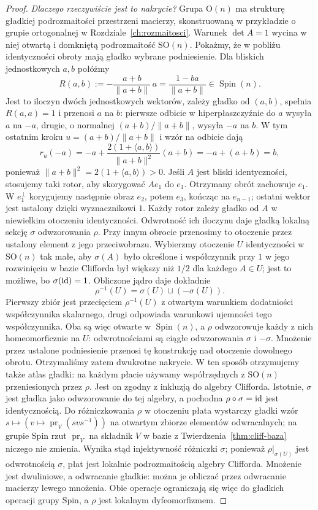\begin{proof}
\emph{Dlaczego rzeczywiście jest to nakrycie?}
Grupa $\mathrm O(n)$ ma strukturę gładkiej podrozmaitości
przestrzeni macierzy, skonstruowaną w przykładzie o grupie
ortogonalnej w Rozdziale~\ref{ch:rozmaitosci}.
Warunek $\det A=1$ wycina w niej otwartą i domkniętą
podrozmaitość $\mathrm{SO}(n)$.
Pokażmy, że w pobliżu identyczności obroty mają
gładko wybrane podniesienie. Dla bliskich
jednostkowych $a,b$ połóżmy
\[
 R(a,b):=-\frac{a+b}{\|a+b\|}\,a
       =\frac{1-ba}{\|a+b\|}\in\operatorname{Spin}(n).
\]
Jest to iloczyn dwóch jednostkowych wektorów,
zależy gładko od $(a,b)$, spełnia $R(a,a)=1$
i przenosi $a$ na $b$: pierwsze odbicie w
hiperpłaszczyźnie do $a$ wysyła $a$ na $-a$,
drugie, o normalnej $(a+b)/\|a+b\|$, wysyła
$-a$ na $b$.
W tym ostatnim kroku $u=(a+b)/\|a+b\|$ i wzór na odbicie dają
\[
 r_u(-a)
 =-a+\frac{2(1+\langle a,b\rangle)}{\|a+b\|^2}(a+b)
 =-a+(a+b)=b,
\]
ponieważ $\|a+b\|^2=2(1+\langle a,b\rangle)>0$.
Jeśli $A$ jest bliski identyczności,
stosujemy taki rotor, aby skorygować $Ae_1$ do
$e_1$. Otrzymany obrót zachowuje $e_1$.
W $e_1^\perp$ korygujemy następnie obraz
$e_2$, potem $e_3$, kończąc na $e_{n-1}$;
ostatni wektor jest ustalony dzięki wyznacznikowi
$1$. Każdy rotor zależy gładko od $A$
w niewielkim otoczeniu identyczności.
Odwrotność ich iloczynu daje gładką lokalną
sekcję $\sigma$ odwzorowania $\rho$.
Przy innym obrocie przenosimy to otoczenie
przez ustalony element z jego przeciwobrazu.
Wybierzmy otoczenie $U$ identyczności w $\mathrm{SO}(n)$
tak małe, aby $\sigma(A)$ było określone i współczynnik
przy $1$ w jego rozwinięciu w bazie Clifforda był większy
niż $1/2$ dla każdego $A\in U$; jest to możliwe, bo
$\sigma(\mathrm{id})=1$. Obliczone jądro daje dokładnie
\[
 \rho^{-1}(U)=\sigma(U)\sqcup(-\sigma(U)).
\]
Pierwszy zbiór jest przecięciem $\rho^{-1}(U)$
z otwartym warunkiem dodatniości współczynnika skalarnego,
drugi odpowiada warunkowi ujemności tego współczynnika.
Oba są więc otwarte w $\operatorname{Spin}(n)$, a $\rho$
odwzorowuje każdy z nich homeomorficznie na $U$:
odwrotnościami są ciągłe odwzorowania $\sigma$ i $-\sigma$.
Mnożenie przez ustalone podniesienie przenosi tę konstrukcję
nad otoczenie dowolnego obrotu. Otrzymaliśmy zatem
dwukrotne nakrycie.
W ten sposób otrzymujemy także atlas gładki: na każdym płacie
używamy współrzędnych z $\mathrm{SO}(n)$ przeniesionych przez $\rho$.
Jest on zgodny z inkluzją do algebry Clifforda. Istotnie,
$\sigma$ jest gładka jako odwzorowanie do tej algebry, a pochodna
$\rho\circ\sigma=\mathrm{id}$ jest identycznością. Do różniczkowania
$\rho$ w otoczeniu płata wystarczy gładki wzór
$s\mapsto(v\mapsto\operatorname{pr}_V(svs^{-1}))$
na otwartym zbiorze elementów odwracalnych; na grupie Spin
rzut $\operatorname{pr}_V$ na składnik $V$ w bazie
z Twierdzenia~\ref{thm:cliff-baza} niczego nie zmienia.
Wynika stąd injektywność różniczki $\sigma$; ponieważ
$\rho|_{\sigma(U)}$ jest odwrotnością $\sigma$, płat
jest lokalnie podrozmaitością algebry Clifforda. Mnożenie jest
dwuliniowe, a odwracanie gładkie: można je obliczać przez
odwracanie macierzy lewego mnożenia. Obie operacje ograniczają
się więc do gładkich operacji grupy Spin, a $\rho$ jest lokalnym dyfeomorfizmem.
\end{proof}


